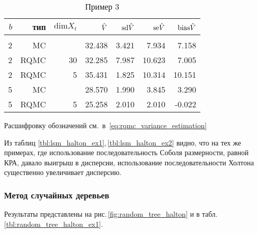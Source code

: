 \begin{table}
    \caption{Пример 3}\label{tbl:lsm_halton_ex3}
    \begin{tabular}{rrrrrrr}
        $b$&тип&$\mathrm{dim} X_t$&$\hat{V}$&$\mathrm{sd}\hat{V}$&$\mathrm{se}\hat{V}$&$\mathrm{bias}\hat{V}$\\[3pt]\hline\\[-8pt]
        2&MC&&32.438&3.421&7.934&7.158\\
        2&RQMC&30&32.285&7.987&10.623&7.005\\
        2&RQMC&5&35.431&1.825&10.314&10.151\\[3pt]
        5&MC&&28.570&1.990&3.845&3.290\\
        5&RQMC&5&25.258&2.010&2.010&-0.022\\[3pt]
    \end{tabular}

    \footnotesize{Расшифровку обозначений см.~в~\ref{eq:rqmc_variance_estimation}}
\end{table}

Из таблиц \ref{tbl:lsm_halton_ex1},\,\ref{tbl:lsm_halton_ex2} видно, что на тех же примерах, где использование последовательность Соболя размерности, равной КРА, давало выигрыш в дисперсии, использование последовательности Холтона существенно увеличивает дисперсию. %


\subsubsection{Метод случайных деревьев} %
\label{ssub:results:qmc_to_classical:halton:random_tree}

Результаты представлены на рис.\,\ref{fig:random_tree_halton} и в табл.\,\ref{tbl:random_tree_halton_ex1}.%

